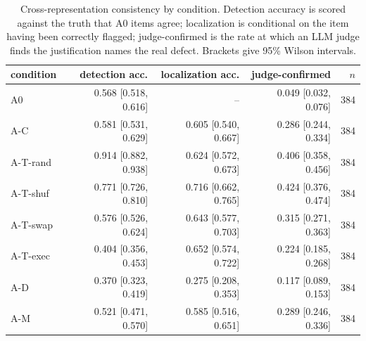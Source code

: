 \begin{table}[t]
\centering
\small
\begin{tabular}{lrrrr}
\toprule
condition & detection acc. & localization acc. & judge-confirmed & $n$ \\
\midrule
A0 & 0.568 [0.518, 0.616] & -- & 0.049 [0.032, 0.076] & 384 \\
A-C & 0.581 [0.531, 0.629] & 0.605 [0.540, 0.667] & 0.286 [0.244, 0.334] & 384 \\
A-T-rand & 0.914 [0.882, 0.938] & 0.624 [0.572, 0.673] & 0.406 [0.358, 0.456] & 384 \\
A-T-shuf & 0.771 [0.726, 0.810] & 0.716 [0.662, 0.765] & 0.424 [0.376, 0.474] & 384 \\
A-T-swap & 0.576 [0.526, 0.624] & 0.643 [0.577, 0.703] & 0.315 [0.271, 0.363] & 384 \\
A-T-exec & 0.404 [0.356, 0.453] & 0.652 [0.574, 0.722] & 0.224 [0.185, 0.268] & 384 \\
A-D & 0.370 [0.323, 0.419] & 0.275 [0.208, 0.353] & 0.117 [0.089, 0.153] & 384 \\
A-M & 0.521 [0.471, 0.570] & 0.585 [0.516, 0.651] & 0.289 [0.246, 0.336] & 384 \\
\bottomrule
\end{tabular}
\caption{Cross-representation consistency by condition. Detection accuracy is scored against the truth that A0 items agree; localization is conditional on the item having been correctly flagged; judge-confirmed is the rate at which an LLM judge finds the justification names the real defect. Brackets give 95\% Wilson intervals.}
\label{tab:consistency-main}
\end{table}
